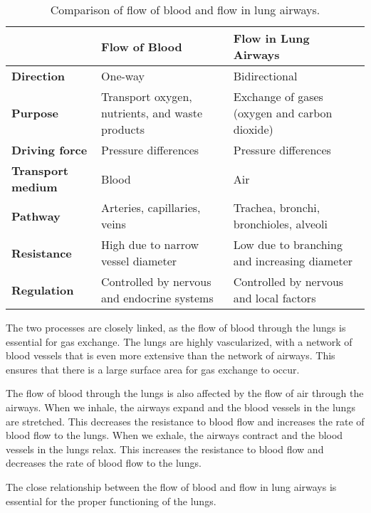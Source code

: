 \documentclass[12pt, a4paper]{article} %
\begin{document}
\begin{table}[htbp]
  \centering
  \begin{tabularx}{\textwidth}{|X|X|X|}
    \hline
    & \textbf{Flow of Blood} & \textbf{Flow in Lung Airways} \\ \hline
    \textbf{Direction} & One-way & Bidirectional \\ \hline
    \textbf{Purpose} & Transport oxygen, nutrients, and waste products & Exchange of gases (oxygen and carbon dioxide) \\ \hline
    \textbf{Driving force} & Pressure differences & Pressure differences \\ \hline
    \textbf{Transport medium} & Blood & Air \\ \hline
    \textbf{Pathway} & Arteries, capillaries, veins & Trachea, bronchi, bronchioles, alveoli \\ \hline
    \textbf{Resistance} & High due to narrow vessel diameter & Low due to branching and increasing diameter \\ \hline
    \textbf{Regulation} & Controlled by nervous and endocrine systems & Controlled by nervous and local factors \\ \hline
  \end{tabularx}
  \caption{Comparison of flow of blood and flow in lung airways.}
  \label{tab:comparison}
\end{table}


    
The two processes are closely linked, as the flow of blood through the lungs is essential for gas exchange. The lungs are highly vascularized, with a network of blood vessels that is even more extensive than the network of airways. This ensures that there is a large surface area for gas exchange to occur.

The flow of blood through the lungs is also affected by the flow of air through the airways. When we inhale, the airways expand and the blood vessels in the lungs are stretched. This decreases the resistance to blood flow and increases the rate of blood flow to the lungs. When we exhale, the airways contract and the blood vessels in the lungs relax. This increases the resistance to blood flow and decreases the rate of blood flow to the lungs.

The close relationship between the flow of blood and flow in lung airways is essential for the proper functioning of the lungs.
\end{document}
